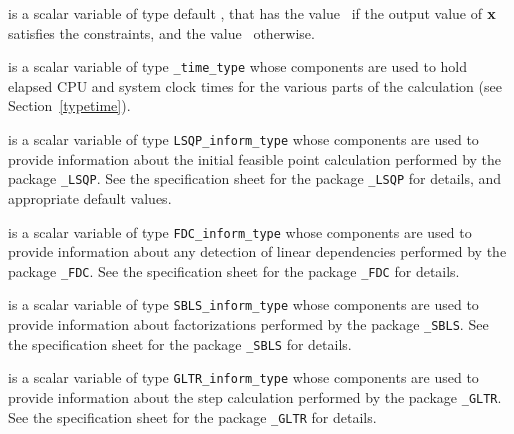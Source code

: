 \begin{description}
 is a scalar variable of type default \logical, that has the
value \true\ if the output value of ${\mathbf{x}}$ satisfies the constraints,
and the value \false\ otherwise.

 is a scalar variable of type {\tt \packagename\_time\_type}
whose components are used to hold elapsed CPU  and system clock
times for the various parts of the calculation (see Section~\ref{typetime}).

 is a scalar variable of type
{\tt LSQP\_inform\_type}
whose components are used to provide information about the
initial feasible point calculation
performed by the package
{\tt \libraryname\_LSQP}.
See the specification sheet for the package
{\tt \libraryname\_LSQP}
for details, and appropriate default values.

 is a scalar variable of type
{\tt FDC\_inform\_type}
whose components are used to provide information about
any detection of linear dependencies
performed by the package
{\tt \libraryname\_FDC}.
See the specification sheet for the package
{\tt \libraryname\_FDC} for details.

 is a scalar variable of type
{\tt SBLS\_inform\_type}
whose components are used to provide information about factorizations
performed by the package
{\tt \libraryname\_SBLS}.
See the specification sheet for the package
{\tt \libraryname\_SBLS} for details.

 is a scalar variable of type
{\tt GLTR\_inform\_type}
whose components are used to provide information about the step calculation
performed by the package
{\tt \libraryname\_GLTR}.
See the specification sheet for the package
{\tt \libraryname\_GLTR}
for details.

\end{description}
